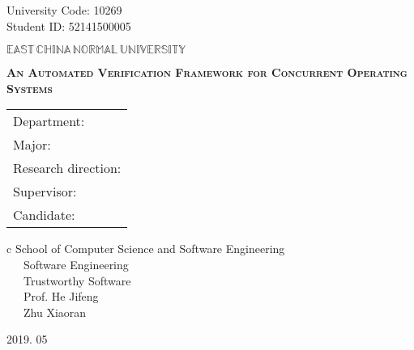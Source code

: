 \newpage

\pagestyle{empty}

\hskip 1.83cm {\large University Code: 10269}\\
\hspace*{\fill} {\large Student ID: 52141500005}

\vskip 2cm

\begin{center}
{\Huge $\mathbb{EAST}\,\mathbb{CHINA}\,\mathbb{NORMAL}\,
\mathbb{UNIVERSITY}$}
\end{center}

\vskip 3cm

\begin{center}
\bfseries{\scshape{\huge An Automated Verification Framework for Concurrent Operating Systems}}\\
\end{center}

\vskip 2cm {\large
\begin{center}
\begin{tabular}{l}
Department:\\
Major:\\
Research direction:\\
Supervisor:\\
Candidate:
\end{tabular}
\begin{tabular}c
\normalsize{School of Computer Science and Software Engineering}\\
\hline ~~~Software Engineering    \\
\hline ~~~Trustworthy Software\\
\hline ~~~Prof. He Jifeng \\
\hline ~~~Zhu Xiaoran  \\
\hline
\end{tabular}
\end{center}}

\vskip 30mm

\begin{center}
{\Large 2019. 05}
\end{center}
